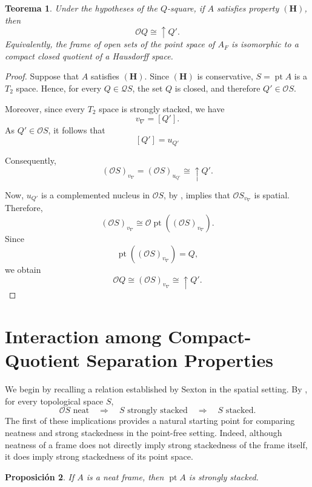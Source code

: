 \documentclass[11pt]{amsart}
\DeclareMathOperator{\pt}{pt}
\theoremstyle{plain}
\newtheorem{thm}{Teorema}[section]
\newtheorem{prop}[thm]{Proposición}
\theoremstyle{definition}
\begin{document}
\begin{thm}\label{haus1}
Under the hypotheses of the $Q$-square, if $A$ satisfies property $\mathbf{(H)}$, then
\[
\mathcal{O}Q\cong \uparrow Q'.
\]
Equivalently, the frame of open sets of the point space of $A_F$ is isomorphic to a compact closed quotient of 
a Hausdorff space.
\end{thm}

\begin{proof}
Suppose that $A$ satisfies $\mathbf{(H)}$. Since $\mathbf{(H)}$ is conservative, $S=\pt A$ is a $T_2$ space. Hence, for every $Q\in \mathcal{Q}S$, the set $Q$ is closed, and therefore $Q'\in \mathcal{O}S$.

Moreover, since every $T_2$ space is strongly stacked, we have
\[
v_\nabla=[Q'].
\]
As $Q'\in \mathcal{O}S$, it follows that 
\[
[Q']=u_{Q'}
\]

Consequently,
\[
(\mathcal{O}S)_{v_\nabla}=(\mathcal{O}S)_{u_{Q'}}\cong \uparrow Q'.
\]

Now, $u_{Q'}$ is a complemented nucleus in $\mathcal{O}S$, by \cite[Proposition VI.3.3]{PicadoPultr}, implies that $\mathcal{O}S_{v_\nabla}$ is spatial. Therefore, 
\[
(\mathcal{O}S)_{v_\nabla}\cong\mathcal{O}\pt((\mathcal{O}S)_{v_\nabla}).
\]
Since
\[
\pt((\mathcal{O}S)_{v_\nabla})=Q,
\]
we obtain
\[
\mathcal{O}Q\cong (\mathcal{O}S)_{v_\nabla}\cong \uparrow Q'.
\]
\end{proof}

\section{Interaction among Compact-Quotient Separation Properties}\label{Interaccion entre propiedades}

We begin by recalling a relation established by Sexton in the spatial
setting. By \cite[Theorem 6.2 (a)]{sexton2006ordinal}, for every topological
space \(S\),
\[
    \mathcal{O}S\text{ neat}
    \quad\Longrightarrow\quad
    S\text{ strongly stacked}
    \quad\Longrightarrow\quad
    S\text{ stacked}.
\]
The first of these implications provides a natural starting point for
comparing neatness and strong stackedness in the point-free setting.
Indeed, although neatness of a frame does not directly imply strong
stackedness of the frame itself, it does imply strong stackedness of
its point space.


\begin{prop}
If $A$ is a neat frame, then $\pt A$ is strongly stacked.
\end{prop}
\end{document}
